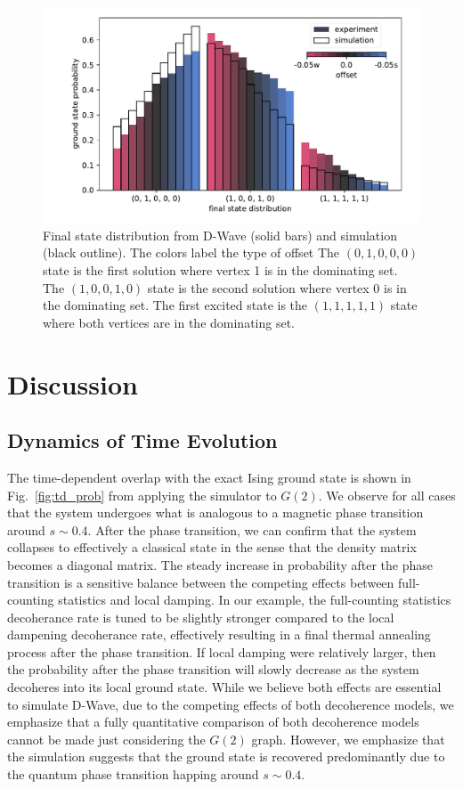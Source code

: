 \documentclass[prd,twocolumn,tightenlines,preprintnumbers,showpacs,superscriptaddress,notitlepage,nofootinbib,eqsecnum,floatfix,longbibliography,aps,10pt]{revtex4-1}
\begin{document}
\begin{figure}
	\centering
	\includegraphics[width=\columnwidth]{./final_state_distribution.pdf}
	\caption{Final state distribution from D-Wave (solid bars) and simulation (black outline). The colors label the type of offset  The $(0, 1, 0, 0, 0)$ state is the first solution where vertex 1 is in the dominating set. The $(1, 0, 0, 1, 0)$ state is the second solution where vertex 0 is in the dominating set. The first excited state is the $(1, 1, 1, 1, 1)$ state where both vertices are in the dominating set.}
	\label{fig:final_state_distribution}
\end{figure}


\section{Discussion}
\subsection{Dynamics of Time Evolution}
\label{sec:discussion:time_evolution}

The time-dependent overlap with the exact Ising ground state is shown in Fig.~\ref{fig:td_prob} from applying the simulator to $G(2)$. We observe for all cases that the system undergoes what is analogous to a magnetic phase transition around $s\sim 0.4$.
After the phase transition, we can confirm that the system collapses to effectively a classical state in the sense that the density matrix becomes a diagonal matrix.
The steady increase in probability after the phase transition is a sensitive balance between the competing effects between full-counting statistics and local damping.
In our example, the full-counting statistics decoherance rate is tuned to be slightly stronger compared to the local dampening decoherance rate, effectively resulting in a final thermal annealing process after the phase transition.
If local damping were relatively larger, then the probability after the phase transition will slowly decrease as the system decoheres into its local ground state.
While we believe both effects are essential to simulate D-Wave, due to the competing effects of both decoherence models, we emphasize that a fully quantitative comparison of both decoherence models cannot be made just considering the $G(2)$ graph.
However, we emphasize that the simulation suggests that the ground state is recovered predominantly due to the quantum phase transition happing around $s\sim 0.4$.
\end{document}
